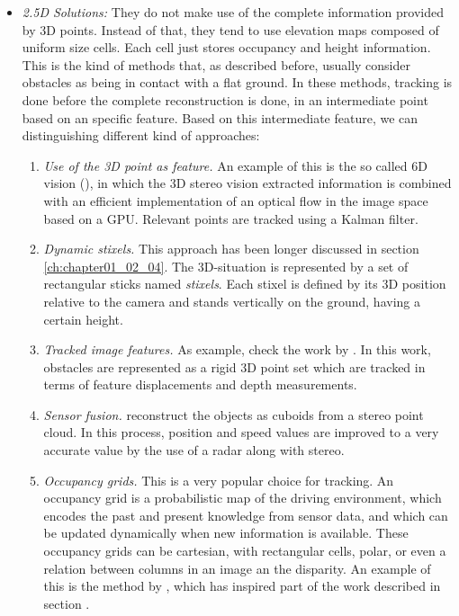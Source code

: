 \begin{itemize}
 \item \emph{2.5D Solutions:} They do not make use of the complete information provided by 3D points. Instead of that, they tend to use elevation maps composed of uniform size cells. Each cell just stores occupancy and height information. This is the kind of methods that, as described before, usually consider obstacles as being in contact with a flat ground.
 In these methods, tracking is done before the complete reconstruction is done, in an intermediate point based on an specific feature. Based on this intermediate feature, we can distinguishing different kind of approaches:
  \begin{enumerate}
   \item \emph{Use of the 3D point as feature.} An example of this is the so called 6D vision (\cite{franke20056d}), in which the 3D stereo vision extracted information is combined with an efficient implementation of an optical flow in the image space based on a \ac{GPU}. Relevant points are tracked using a Kalman filter.
   \item \emph{Dynamic stixels.} This approach has been longer discussed in section \ref{ch:chapter01_02_04}. The 3D-situation is represented by a set of rectangular sticks named \emph{stixels}. Each stixel is defined by its 3D position relative to the camera and stands vertically on the ground, having a certain height.
   \item \emph{Tracked image features.} As example, check the work by \cite{barth2009estimating}. In this work, obstacles are represented as a rigid 3D point set which are tracked in terms of feature displacements and depth measurements.
   \item \emph{Sensor fusion.} \cite{wu2009collision} reconstruct the objects as cuboids from a stereo point cloud. In this process, position and speed values are improved to a very accurate value by the use of a radar along with stereo.
   \item \emph{Occupancy grids.} This is a very popular choice for tracking. An occupancy grid is a probabilistic map of the driving environment, which encodes the past and present knowledge from sensor data, and which can be updated dynamically when new information is available. These occupancy grids can be cartesian, with rectangular cells, polar, or even a relation between columns in an image an the disparity. An example of this is the method by \cite{danescu2012particle}, which has inspired part of the work described in section \todo { \ref{XXX}}.

\end{enumerate}
\end{itemize}
